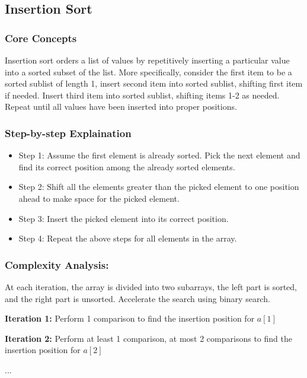 \subsection{Insertion Sort}

\subsubsection{Core Concepts}
Insertion sort orders a list of values by repetitively inserting a particular value into a sorted subset of the list. More specifically, consider the first item to be a sorted sublist of length 1, insert second item into sorted sublist, shifting first item if needed. Insert third item into sorted sublist, shifting items 1-2 as needed. Repeat until all values have been inserted into proper positions. ~\cite{ref1}

\vspace{5pt}

\subsubsection{Step-by-step Explaination}
\begin{itemize}[label=-]
    \item Step 1: Assume the first element is already sorted. Pick the next element and find its correct position among the already sorted elements.
    \item Step 2: Shift all the elements greater than the picked element to one position ahead to make space for the picked element.
    \item Step 3: Insert the picked element into its correct position.
    \item Step 4: Repeat the above steps for all elements in the array.
\end{itemize}

\subsubsection{Complexity Analysis:}
At each iteration, the array is divided into two subarrays, the left part is sorted, and the right part is unsorted. Accelerate the search using binary search.

\textbf{Iteration 1:} Perform 1 comparison to find the insertion position for $a[1]$

\textbf{Iteration 2:} Perform at least 1 comparison, at most 2 comparisons to find the insertion position for $a[2]$

...


